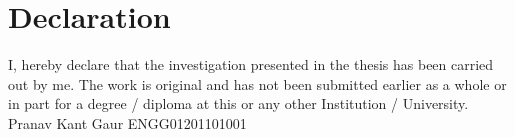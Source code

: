 \chapter*{Declaration}
I, hereby declare that the investigation presented in the thesis has been carried out by me. The
work is original and has not been submitted earlier as a whole or in part for a degree / diploma
at this or any other Institution / University.
\newline
\newline
\newline
\newline
\newline
\indent \indent \indent \indent \indent \indent \indent \indent \indent \indent \indent \indent \indent \indent \indent \indent  \indent \indent \indent \indent Pranav Kant Gaur\newline 
\indent \indent \indent \indent \indent \indent \indent \indent \indent \indent \indent \indent \indent \indent \indent \indent  \indent \indent \indent \indent ENGG01201101001
